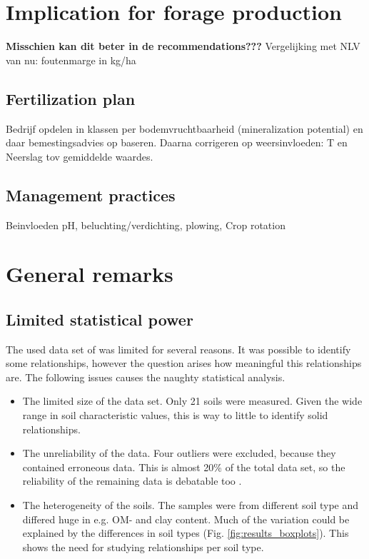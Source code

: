 \documentclass[10pt,twoside,dutch,english]{report}
\begin{document}
\section{Implication for forage production}
\textbf{Misschien kan dit beter in de recommendations???}
Vergelijking met NLV van nu: foutenmarge in kg/ha 

\subsection{Fertilization plan}
Bedrijf opdelen in klassen per bodemvruchtbaarheid (mineralization potential) en daar bemestingsadvies op baseren. Daarna corrigeren op weersinvloeden: T en Neerslag tov gemiddelde waardes. 

\subsection{Management practices}
Beinvloeden pH, beluchting/verdichting, plowing, Crop rotation



\section{General remarks}
	
\subsection{Limited statistical power}
   The used data set of \citet{Echeverri2014} was limited for several reasons. It was possible to identify some relationships, however the question arises how meaningful this relationships are. The following issues causes the naughty statistical analysis. 
		   \begin{itemize}
   	\item The limited size of the data set. Only 21 soils were measured.  Given the wide range in soil characteristic values, this is way to little to identify solid relationships.
   	\item The unreliability of the data. Four outliers were excluded, because they contained erroneous data. This is almost 20\% of the total data set, so
   	 the reliability of the remaining data is debatable too . 
   	\item The heterogeneity of the soils. The samples were from different soil type and differed huge in e.g. OM- and clay content. Much of the variation could be explained by the differences in soil types (Fig. \ref{fig:results_boxplots}). This shows the need for studying relationships per soil type. 
    \end{itemize} 
   
\end{document}
